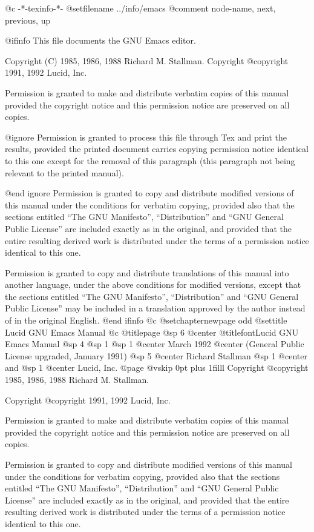   @c -*-texinfo-*-
@setfilename ../info/emacs
@comment  node-name,  next,  previous,  up


@ifinfo
This file documents the GNU Emacs editor.

Copyright (C) 1985, 1986, 1988 Richard M. Stallman.
Copyright @copyright{} 1991, 1992 Lucid, Inc.

Permission is granted to make and distribute verbatim copies of
this manual provided the copyright notice and this permission notice
are preserved on all copies.

@ignore
Permission is granted to process this file through Tex and print the
results, provided the printed document carries copying permission
notice identical to this one except for the removal of this paragraph
(this paragraph not being relevant to the printed manual).

@end ignore
Permission is granted to copy and distribute modified versions of this
manual under the conditions for verbatim copying, provided also that the
sections entitled ``The GNU Manifesto'', ``Distribution'' and ``GNU
General Public License'' are included exactly as in the original, and
provided that the entire resulting derived work is distributed under the
terms of a permission notice identical to this one.

Permission is granted to copy and distribute translations of this manual
into another language, under the above conditions for modified versions,
except that the sections entitled ``The GNU Manifesto'',
``Distribution'' and ``GNU General Public License'' may be included in a
translation approved by the author instead of in the original English.
@end ifinfo
@c
@setchapternewpage odd
@settitle Lucid GNU Emacs Manual
@c
@titlepage
@sp 6
@center @titlefont{Lucid GNU Emacs Manual}
@sp 4
@sp 1
@sp 1
@center March 1992
@center (General Public License upgraded, January 1991)
@sp 5
@center Richard Stallman
@sp 1
@center and
@sp 1
@center Lucid, Inc.
@page
@vskip 0pt plus 1filll
Copyright @copyright{} 1985, 1986, 1988 Richard M. Stallman.

Copyright @copyright{} 1991, 1992 Lucid, Inc.

Permission is granted to make and distribute verbatim copies of
this manual provided the copyright notice and this permission notice
are preserved on all copies.

Permission is granted to copy and distribute modified versions of this
manual under the conditions for verbatim copying, provided also that the
sections entitled ``The GNU Manifesto'', ``Distribution'' and ``GNU
General Public License'' are included exactly as in the original, and
provided that the entire resulting derived work is distributed under the
terms of a permission notice identical to this one.

